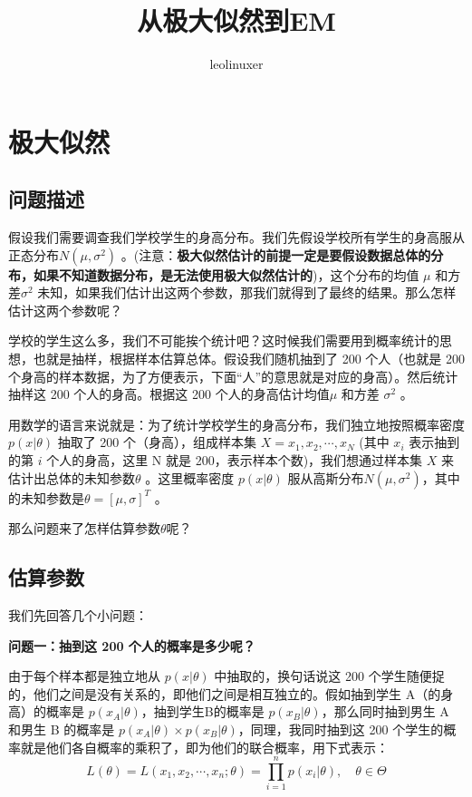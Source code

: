 \documentclass[12pt]{article}
\title{从极大似然到EM\cite{ML_EM_Algorithm_Detailed}\cite{EM_Algorithm_Tutorial}\cite{Everyone_Knows_EM_Algorithm}}
\author{leolinuxer}
\begin{document}
\maketitle
\tableofcontents

\section{极大似然}
\subsection{问题描述}
假设我们需要调查我们学校学生的身高分布。我们先假设学校所有学生的身高服从正态分布$N(\mu, \sigma^2)$ 。(注意：\textbf{极大似然估计的前提一定是要假设数据总体的分布，如果不知道数据分布，是无法使用极大似然估计的})，这个分布的均值 $\mu$ 和方差$\sigma^2$ 未知，如果我们估计出这两个参数，那我们就得到了最终的结果。那么怎样估计这两个参数呢？

学校的学生这么多，我们不可能挨个统计吧？这时候我们需要用到概率统计的思想，也就是抽样，根据样本估算总体。假设我们随机抽到了 200 个人（也就是 200 个身高的样本数据，为了方便表示，下面“人”的意思就是对应的身高）。然后统计抽样这 200 个人的身高。根据这 200 个人的身高估计均值$\mu$ 和方差 $\sigma^2$ 。

用数学的语言来说就是：为了统计学校学生的身高分布，我们独立地按照概率密度 $p(x|\theta)$ 抽取了 200 个（身高），组成样本集 $X = x_1, x_2, \cdots, x_N$ (其中 $x_i$ 表示抽到的第 $i$ 个人的身高，这里 N 就是 200，表示样本个数)，我们想通过样本集 $X$ 来估计出总体的未知参数$\theta$ 。这里概率密度 $p(x|\theta)$ 服从高斯分布$N(\mu, \sigma^2)$，其中的未知参数是$\theta=[\mu, \sigma]^T$ 。

那么问题来了怎样估算参数$\theta$呢？

\subsection{估算参数}
我们先回答几个小问题：

\textbf{问题一：抽到这 200 个人的概率是多少呢？}

由于每个样本都是独立地从 $p(x|\theta)$ 中抽取的，换句话说这 200 个学生随便捉的，他们之间是没有关系的，即他们之间是相互独立的。假如抽到学生 A（的身高）的概率是 $p(x_A|\theta)$，抽到学生B的概率是 $p(x_B|\theta)$，那么同时抽到男生 A 和男生 B 的概率是 $p(x_A|\theta) \times p(x_B|\theta)$，同理，我同时抽到这 200 个学生的概率就是他们各自概率的乘积了，即为他们的联合概率，用下式表示：
$$
L(\theta)  = L(x_1, x_2, \cdots, x_n; \theta) = \prod_{i=1}^np(x_i|\theta), \quad \theta \in \Theta
$$
\end{document}
